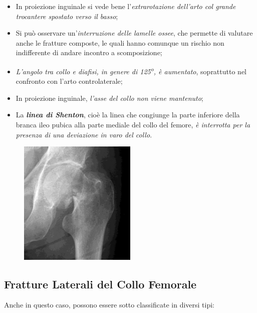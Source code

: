 \begin{itemize}
\item
  In proiezione inguinale si vede bene l'\emph{extrarotazione dell'arto
  col grande trocantere spostato verso il basso};
\item
  Si può osservare un'\emph{interruzione delle lamelle ossee}, che
  permette di valutare anche le fratture composte, le quali hanno
  comunque un rischio non indifferente di andare incontro a
  scomposizione;
\item
  \emph{L'angolo tra collo e diafisi, in genere di 125\textsuperscript{o}, è aumentato},
  soprattutto nel confronto con l'arto controlaterale;
\item
  In proiezione inguinale, \emph{l'asse del collo non viene mantenuto};
\item
  La \textbf{\emph{linea di Shenton}}, cioè la linea che congiunge la
  parte inferiore della branca ileo pubica alla parte mediale del collo
  del femore, \emph{è interrotta per la presenza di una deviazione in
  varo del collo}.
\end{itemize}
\begin{figure}[!ht]
\centering
	\includegraphics[width=0.5\textwidth]{007/image10.png}
\end{figure}
\subsection{Fratture Laterali del Collo Femorale}


Anche in questo caso, possono essere sotto classificate in diversi tipi:

